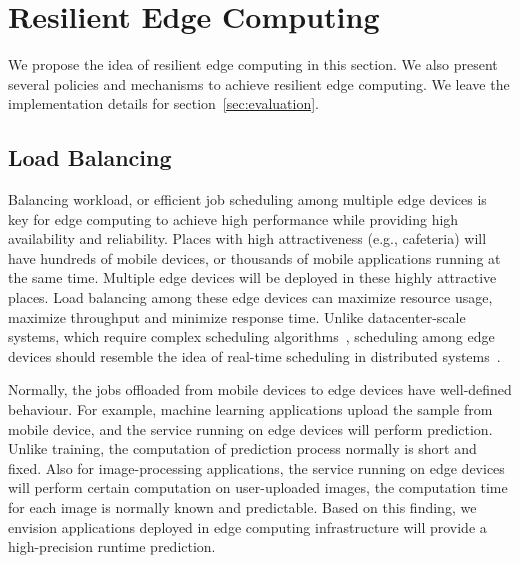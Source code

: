\section{Resilient Edge Computing}
\label{sec:resilient-egde}

We propose the idea of resilient edge computing in this section.
We also present several policies and mechanisms to achieve resilient edge computing.
We leave the implementation details for section~\ref{sec:evaluation}.

\subsection{Load Balancing}
\label{sec:load-balancing}
Balancing workload, or efficient job scheduling among multiple edge devices is key for edge computing
to achieve high performance while providing high availability and reliability.
Places with high attractiveness (e.g., cafeteria) will have hundreds of mobile devices,
or thousands of mobile applications running at the same time. Multiple edge devices
will be deployed in these highly attractive places. Load balancing among these
edge devices can maximize resource usage, maximize throughput and minimize response time.
Unlike datacenter-scale systems, which require complex scheduling algorithms~\cite{DRF-NSDI11,Borg-Eurosys15},
scheduling among edge devices should resemble the idea of real-time scheduling in distributed systems~\cite{rt-sched98}.

Normally, the jobs offloaded from mobile devices to edge devices have well-defined behaviour.
For example, machine learning applications upload the sample from mobile device, and the
service running on edge devices will perform prediction. Unlike training, the computation
of prediction process normally is short and fixed. Also for image-processing applications, the
service running on edge devices will perform certain computation on user-uploaded images, the
computation time for each image is normally known and predictable. Based on this finding,
we envision applications deployed in edge computing infrastructure will provide a high-precision runtime prediction.

